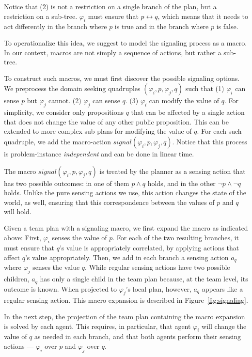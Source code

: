 \documentclass[letterpaper]{article} %
\theoremstyle{definition}
\begin{document}
Notice that (2) is not a restriction on a single branch of the plan, but a restriction on a sub-tree. $\varphi_i$ must ensure that $p\leftrightarrow q$, which means that it needs to act differently in the
branch where $p$ is true and in the branch where $p$ is false. 

To operationalize this idea, we suggest to model the signaling process as a macro.
In our context, macros are not simply 
a sequence of actions, but rather a sub-tree. 

To construct such macros, we must first discover the possible signaling options. We preprocess the domain seeking quadruples $(\varphi_i, p, \varphi_j, q)$ such that
(1) $\varphi_i$ can sense $p$ but $\varphi_j$ cannot. (2) $\varphi_j$ can sense $q$. 
(3) $\varphi_i$ can modify the value of $q$. 
For simplicity, we consider only propositions $q$ that can be affected by a single action that does not change the value of any other public proposition. This can be extended to more complex sub-plans for modifying the value of $q$.
For each such quadruple, we add the macro-action $signal(\varphi_i, p, \varphi_j, q)$. Notice that this process is problem-instance {\em independent} and can be done in linear time.


The macro $signal(\varphi_i, p, \varphi_j, q)$ is treated by the planner as a sensing action that has two possible outcomes: in one of them $p\wedge q$ holds, and in the other $\neg p\wedge \neg q$ holds. Unlike the pure sensing actions we use, this action changes the state of the world, as well, ensuring that this correspondence between the values of $p$ and $q$ will hold.

Given a team plan with a signaling macro, we first expand the macro as indicated above: First, $\varphi_i$ senses the value of $p$. For each of the two resulting branches, it must ensure that $q$'s value is appropriately correlated, by applying actions that affect $q$'s value appropriately. Then, we add in each branch a sensing action $a_q$ where $\varphi_j$ senses the value $q$. While regular sensing actions have two possible children, $a_q$ has only a single child in the team plan because, at the team level, its outcome is known.
When projected to $\varphi_j$'s local plan, however, $a_q$ appears like a regular sensing action. This macro expansion is described in Figure~\ref{fig:signaling}.



In the next step, the projection of the team plan containing the macro expansion is solved by each agent. This requires, in particular, that agent $\varphi_i$ will change the value of $q$ as needed in each branch, and that both agents perform their sensing actions --- $\varphi_i$ over $p$ and $\varphi_j$ over $q$.
\end{document}
